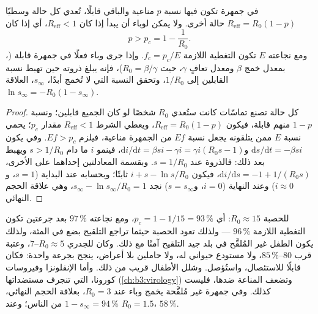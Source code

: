 \begin{theorem}\label{thm:b3:adaptive-immunity:herd}
في جمهرة تكون فيها نسبة $p$ مناعية والباقي قابلًا، تُعدي كل
حالة وسطيًا $R_{\text{eff}} = R_{0}(1 -
p)$ حالة أخرى. ولا يمكن لوباء أن يبدأ إذا كان
$R_{\text{eff}} < 1$، أي إذا كان
\[
p > p_{c} = 1 - \frac{1}{R_{0}} .
\]
ومع  نجاعته $E$ تكون التغطية اللازمة $f_{c} = p_{c}/E$.
وإذا جرى وباء فعلًا في جمهرة قابلة (، بمعدل خمج
$\beta$ ومعدل تعافٍ $\gamma$، حيث $R_{0} =
\beta/\gamma$)، فإنه يبلغ ذروته حين تهبط نسبة القابلين إلى
$1/R_{0}$، وتحقق النسبة التي لا تُخمج أبدًا، $s_{\infty}$،
العلاقة $\ln s_{\infty} = -R_{0}(1 - s_{\infty})$.
\end{theorem}
\begin{proof}
كل حالة تصنع تماسّات كانت ستُعدي $R_{0}$ شخصًا لو كان
الجميع قابلين؛ ونسبة $1 - p$ منهم قابلة، فيكون $R_{\text{eff}} =
R_{0}(1-p)$، ويعطي الشرط $R_{\text{eff}} < 1$ مقدار $p_{c}$؛
 يحمي نسبة $E$ ممن يتلقونه يجعل نسبة $Ef$ من الجمهرة
مناعية، فيلزم $Ef > p_{c}$. وفي  يكون
$\mathrm{d}s/\mathrm{d}t = -\beta si$ و$\mathrm{d}i/\mathrm{d}t =
\beta si - \gamma i = \gamma i(R_{0}s - 1)$، فينمو $i$ ما دام $s >
1/R_{0}$ ويهبط بعد ذلك: فالذروة عند $s = 1/R_{0}$. وبقسمة
المعادلتين إحداهما على الأخرى، $\mathrm{d}i/\mathrm{d}s = -1 + 1/(R_{0}s)$، فيكون $i + s -
\ln s/R_{0}$ ثابتًا؛ وبحسابه عند البداية ($s = 1$، و$i
\approx 0$) وعند النهاية ($i = 0$، و$s = s_{\infty}$) نجد
$s_{\infty} - \ln s_{\infty}/R_{0} = 1$، وهي علاقة الحجم النهائي.
\end{proof}

\begin{example}\label{ex:b3:adaptive-immunity:measles}
للحصبة $R_{0} \approx 15$: أي $p_{c} = 1 - 1/15 = 93\,\%$، ومع
 نجاعته $97\,\%$ بعد جرعتين تكون التغطية اللازمة
$96\,\%$ --- ولذلك تعود الحصبة حيثما تراجع التلقيح بضع في
المئة، ولذلك يكون الطفل غير المُلقَّح في بلد جيد التلقيح
آمنًا مع ذلك. وكان للجدري $R_{0} \approx 5$--$7$، وعتبة قرب
$80$--$85\,\%$، ولا مستودع حيواني له، ولا حاملين بلا أعراض،
 ينجح بجرعة واحدة: فكان قابلًا للاستئصال، واستُؤصل.
وشلل الأطفال قريب من ذلك. وأما الإنفلونزا وفيروسات كورونا،
التي تنجرف مستضداتها (\cref{ch:b3:virology}) وتضعف المناعة
ضدها، فليست كذلك. وفي جمهرة غير مُلقَّحة يخمج وباء عند
$R_{0} = 3$، بعلاقة الحجم النهائي، $1 - s_{\infty} = 94\,\%$
من الناس؛ وعند $R_{0} = 1.5$، $58\,\%$.
\end{example}

